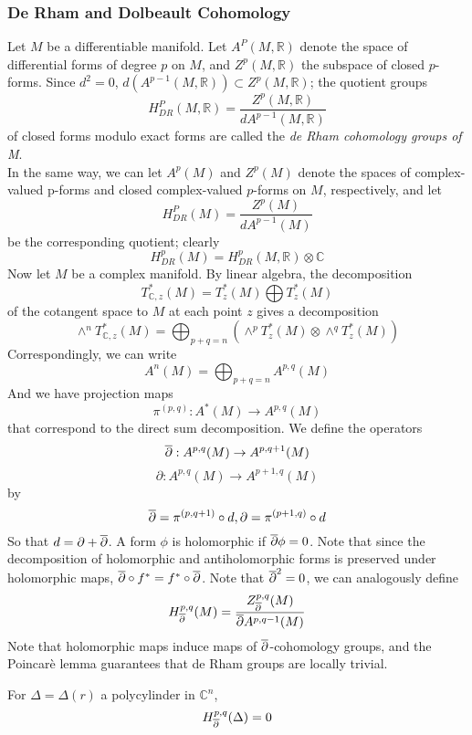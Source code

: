 \subsubsection{De Rham and Dolbeault Cohomology}

\indent Let $M$ be a differentiable manifold. Let $A^P(M, \mathbb{R})$ denote the space of differential forms of degree $p$ on $M$, and $Z^p(M, \mathbb{R})$ the subspace of closed $p$-forms. Since $d^2 = 0$, $d( A^{p-1}(M, \mathbb{R})) \subset Z^p(M, \mathbb{R})$; the quotient groups
\[
	H^P_{DR}(M, \mathbb{R}) = \frac{Z^p(M, \mathbb{R})}{dA^{p-1}(M, \mathbb{R})}
\]
of closed forms modulo exact forms are called the \textit{de Rham cohomology groups of M}. \\
\indent In the same way, we can let $A^p(M)$ and $Z^p(M)$ denote the spaces of complex-valued p-forms and closed complex-valued $p$-forms on $M$, respectively, and let
\[
	H^P_{DR}(M) = \frac{Z^p(M)}{dA^{p-1}(M)}
\]
be the corresponding quotient; clearly
\[
	H^p_{DR}(M) = H^p_{DR}(M, \mathbb{R}) \otimes \mathbb{C}
\]
\indent Now let $M$ be a complex manifold. By linear algebra, the decomposition
\[
	T^*_{ \mathbb{C},z}(M) = T^*_z (M) \bigoplus T^*_z (M)
\]
of the cotangent space to $M$ at each point $z$ gives a decomposition
\[
	\wedge^n T^*_{ \mathbb{C},z} (M) = \bigoplus_{p+q = n} \left( \wedge^p T^*_z(M) \otimes \wedge^q T^*_z (M) \right) 
\]
Correspondingly, we can write
\[
	A^n(M) = \bigoplus_{p+q = n} A^{p,q}(M)
\]
And we have projection maps
\[
	\pi^{(p,q)}: A^*(M) \to A^{p,q}(M)
\]
that correspond to the direct sum decomposition. We define the operators
\[
	\overline{\partial}: A^{p,q}(M) \to A^{p, q+1}(M)
\]
\[
	\partial: A^{p,q}(M) \to A^{p+1,q}(M)
\]
by
\[
	\overline{\partial} = \pi^{(p,q+1)} \circ d, \partial = \pi^{(p+1,q)} \circ d
\]
So that $d = \partial + \overline{\partial}$. A form $\phi$ is holomorphic if $\overline{\partial} \phi = 0$. Note that since the decomposition of holomorphic and antiholomorphic forms is preserved under holomorphic maps, $ \overline{\partial} \circ f^* = f^* \circ \overline{\partial}$. Note that $ \overline{\partial}^2 = 0$, we can analogously define
\[
	H^{p,q}_{ \overline{\partial} } (M) =  \frac{Z^{p,q}_{ \overline{\partial} }(M)}{ \overline{\partial} A^{p, q-1} (M) }
\]
Note that holomorphic maps induce maps of $ \overline{\partial}$-cohomology groups, and the Poincar\`e lemma guarantees that de Rham groups are locally trivial.


\begin{lem}

	For $\Delta = \Delta(r)$ a polycylinder in $ \mathbb{C}^n$,
	\[
		H^{p,q}_{ \overline{\partial} } (\Delta) = 0
	\]
	

\end{lem}

